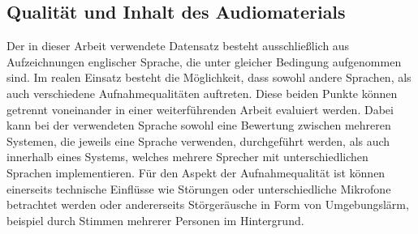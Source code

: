 \subsection{Qualität und Inhalt des Audiomaterials}
Der in dieser Arbeit verwendete Datensatz besteht ausschließlich aus Aufzeichnungen englischer Sprache, die unter gleicher Bedingung aufgenommen sind.
Im realen Einsatz besteht die Möglichkeit, dass sowohl andere Sprachen, als auch verschiedene Aufnahmequalitäten auftreten.
Diese beiden Punkte können getrennt voneinander in einer weiterführenden Arbeit evaluiert werden.
Dabei kann bei der verwendeten Sprache sowohl eine Bewertung zwischen mehreren Systemen, die jeweils eine Sprache verwenden, durchgeführt werden, als auch innerhalb eines Systems, welches mehrere Sprecher mit unterschiedlichen Sprachen implementieren.
Für den Aspekt der Aufnahmequalität ist können einerseits technische Einflüsse wie Störungen oder unterschiedliche Mikrofone betrachtet werden oder andererseits Störgeräusche in Form von Umgebungslärm, beispiel durch Stimmen mehrerer Personen im Hintergrund.